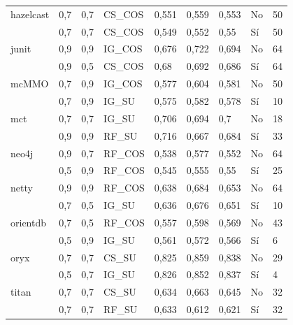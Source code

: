 \begin{table}[H]
{{\begin{tabular}{lllllllll}
hazelcast                      & 0,7  & 0,7 & CS\_COS        & 0,551     & 0,559  & 0,553    & No      & 50           \\
                     & 0,7  & 0,7 & CS\_COS        & 0,549     & 0,552  & 0,55     & Sí  & 50           \\
junit                          & 0,9  & 0,9 & IG\_COS        & 0,676     & 0,722  & 0,694    & No      & 64           \\
                         & 0,9  & 0,5 & CS\_COS        & 0,68      & 0,692  & 0,686    & Sí  & 64           \\
mcMMO                          & 0,7  & 0,9 & IG\_COS        & 0,577     & 0,604  & 0,581    & No      & 50           \\
                         & 0,7  & 0,9 & IG\_SU         & 0,575     & 0,582  & 0,578    & Sí  & 10           \\
mct                            & 0,7  & 0,7 & IG\_SU         & 0,706     & 0,694  & 0,7      & No      & 18           \\
                           & 0,9  & 0,9 & RF\_SU         & 0,716     & 0,667  & 0,684    & Sí  & 33           \\
neo4j                          & 0,9  & 0,7 & RF\_COS        & 0,538     & 0,577  & 0,552    & No      & 64           \\
                        & 0,5  & 0,9 & RF\_COS        & 0,545     & 0,555  & 0,55     & Sí  & 25           \\
netty                          & 0,9  & 0,9 & RF\_COS        & 0,638     & 0,684  & 0,653    & No      & 64           \\
                          & 0,7  & 0,5 & IG\_SU         & 0,636     & 0,676  & 0,651    & Sí  & 10           \\
orientdb                       & 0,7  & 0,5 & RF\_COS        & 0,557     & 0,598  & 0,569    & No      & 43           \\
                      & 0,5  & 0,9 & IG\_SU         & 0,561     & 0,572  & 0,566    & Sí  & 6            \\
oryx                           & 0,7  & 0,7 & CS\_SU         & 0,825     & 0,859  & 0,838    & No      & 29           \\
                           & 0,5  & 0,7 & IG\_SU         & 0,826     & 0,852  & 0,837    & Sí  & 4            \\
titan                          & 0,7  & 0,7 & CS\_SU         & 0,634     & 0,663  & 0,645    & No      & 32           \\
                        & 0,7  & 0,7 & RF\_SU         & 0,633     & 0,612  & 0,621    & Sí  & 32     \\
                        \bottomrule
\end{tabular}%
}}

\end{table}